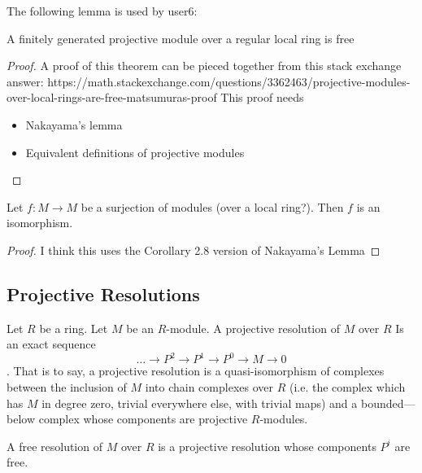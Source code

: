 The following lemma is used by user6:

\begin{lemma} \label{lem:fin_gen_proj_over_local_is_free}
	A finitely generated projective module 
	over a regular local ring is free
\end{lemma}

\begin{proof}
	A proof of this theorem can be pieced together from this
	stack exchange answer:
	https://math.stackexchange.com/questions/3362463/projective-modules-over-local-rings-are-free-matsumuras-proof
	This proof needs
	\begin{itemize}
		\item Nakayama's lemma
		\item Equivalent definitions of projective modules
	\end{itemize}
\end{proof}

\begin{lemma}
  \label{lem:surj_endo_is_isom}
  Let $f : M \to M$ be a surjection of modules 
  (over a local ring?).
  Then $f$ is an isomorphism.
\end{lemma}

\begin{proof}

  I think this uses the Corollary 2.8 version of Nakayama's Lemma
\end{proof}


\subsection{Projective Resolutions}

\begin{definition}
  \label{def:projv_resl}
  Let $R$ be a ring. 
  Let $M$ be an $R$-module.
  A projective resolution of $M$ over $R$
  Is an exact sequence
  \[
    \ldots \to P^2 \to P^1 \to P^0 \to M \to 0
  \].
  That is to say, a projective resolution is a
  quasi-isomorphism of complexes between the 
  inclusion of $M$ into chain complexes over $R$
  (i.e. the complex which has $M$ in degree zero,
  trivial everywhere else, with trivial maps)
  and a bounded—below complex whose
  components are projective $R$-modules.
\end{definition}

\begin{definition}
  \label{def:free_resl}
  A free resolution of $M$ over $R$ is 
  a projective resolution whose components
  $P^i$ are free.
\end{definition}

